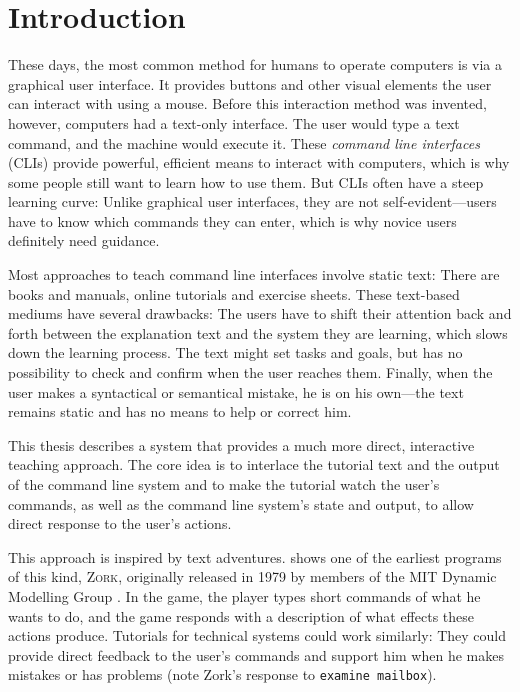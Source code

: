 \documentclass[paper=a4,twoside,abstract=on,cleardoublepage=empty,numbers=noenddot,toc=bib,12pt,appendixprefix=true]{scrreprt}
\begin{document}
\setcounter{tocdepth}{2}
\tableofcontents
\listoffigures

\chapter{Introduction}

These days, the most common method for humans to operate computers is via a graphical user interface. It provides buttons and other visual elements the user can interact with using a mouse. Before this interaction method was invented, however, computers had a text-only interface. The user would type a text command, and the machine would execute it. These \emph{command line interfaces} (CLIs) provide powerful, efficient means to interact with computers, which is why some people still want to learn how to use them. But CLIs often have a steep learning curve: Unlike graphical user interfaces, they are not self-evident---users have to know which commands they can enter, which is why novice users definitely need guidance.

Most approaches to teach command line interfaces involve static text: There are books and manuals, online tutorials and exercise sheets. These text-based mediums have several drawbacks: The users have to shift their attention back and forth between the explanation text and the system they are learning, which slows down the learning process. The text might set tasks and goals, but has no possibility to check and confirm when the user reaches them. Finally, when the user makes a syntactical or semantical mistake, he is on his own---the text remains static and has no means to help or correct him.

This thesis describes a system that provides a much more direct, interactive teaching approach. The core idea is to interlace the tutorial text and the output of the command line system and to make the tutorial watch the user's commands, as well as the command line system's state and output, to allow direct response to the user's actions.

This approach is inspired by text adventures.  shows one of the earliest programs of this kind, \textsc{Zork}, originally released in 1979 by members of the MIT Dynamic Modelling Group \cite{infocom}. In the game, the player types short commands of what he wants to do, and the game responds with a description of what effects these actions produce. Tutorials for technical systems could work similarly: They could provide direct feedback to the user's commands and support him when he makes mistakes or has problems (note Zork's response to \texttt{examine mailbox}).
\end{document}
